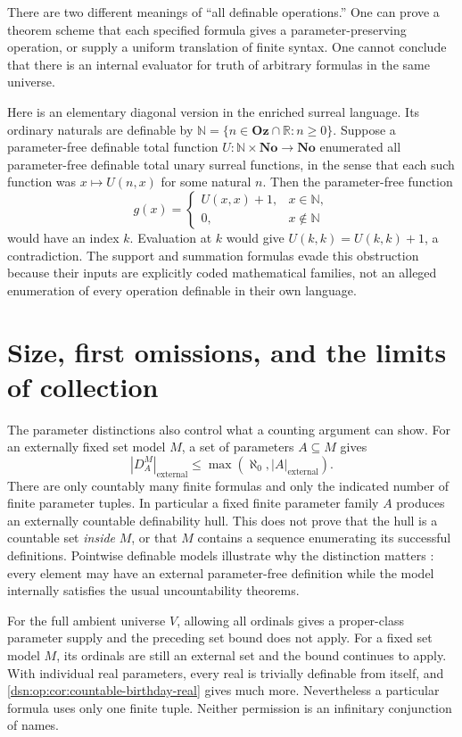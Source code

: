 \documentclass[11pt,a4paper]{article}
\numberwithin{equation}{section}
\theoremstyle{definition}
\theoremstyle{remark}
\newcommand{\No}{\mathbf{No}}
\newcommand{\Oz}{\mathbf{Oz}}
\newcommand{\N}{\mathbb N}
\newcommand{\R}{\mathbb R}
\begin{document}
There are two different meanings of ``all definable operations.''  One
can prove a theorem scheme that each specified formula gives a
parameter-preserving operation, or supply a uniform translation of
finite syntax.  One cannot conclude that there is an internal evaluator
for truth of arbitrary formulas in the same universe.

Here is an elementary diagonal version in the enriched surreal language.
Its ordinary naturals are definable by
\(\N=\{n\in\Oz\cap\R:n\ge0\}\).  Suppose a parameter-free definable
total function \(U:\N\times\No\to\No\) enumerated all parameter-free
definable total unary surreal functions, in the sense that each such
function was \(x\mapsto U(n,x)\) for some natural \(n\).  Then the
parameter-free function
\[
 g(x)=\begin{cases}U(x,x)+1,&x\in\N,\\0,&x\notin\N\end{cases}
\]
would have an index \(k\).  Evaluation at \(k\) would give
\(U(k,k)=U(k,k)+1\), a contradiction.  The support and summation
formulas evade this obstruction because their inputs are explicitly
coded mathematical families, not an alleged enumeration of every
operation definable in their own language.

\section{Size, first omissions, and the limits of collection}
\label{dsn:op:sec:first-omissions}

The parameter distinctions also control what a counting argument can
show.  For an externally fixed set model \(M\), a set of parameters
\(A\subseteq M\) gives
\[
 |D_A^M|_{\mathrm{external}}\le
          \max(\aleph_0,|A|_{\mathrm{external}}).
\]
There are only countably many finite formulas and only the indicated
number of finite parameter tuples.  In particular a fixed finite
parameter family \(A\) produces an externally countable definability hull.  This does
not prove that the hull is a countable set \emph{inside} \(M\), or that
\(M\) contains a sequence enumerating its successful definitions.
Pointwise definable models illustrate why the distinction matters
\cite{HLR}: every element may have an external parameter-free definition
while the model internally satisfies the usual uncountability theorems.

For the full ambient universe \(V\), allowing all ordinals gives a
proper-class parameter supply and the preceding set bound does not apply.
For a fixed set model \(M\), its ordinals are still an external set and
the bound continues to apply.  With
individual real parameters, every real is trivially definable from
itself, and \cref{dsn:op:cor:countable-birthday-real} gives much more.
Nevertheless a particular formula uses only one finite tuple.  Neither
permission is an infinitary conjunction of names.
\end{document}
